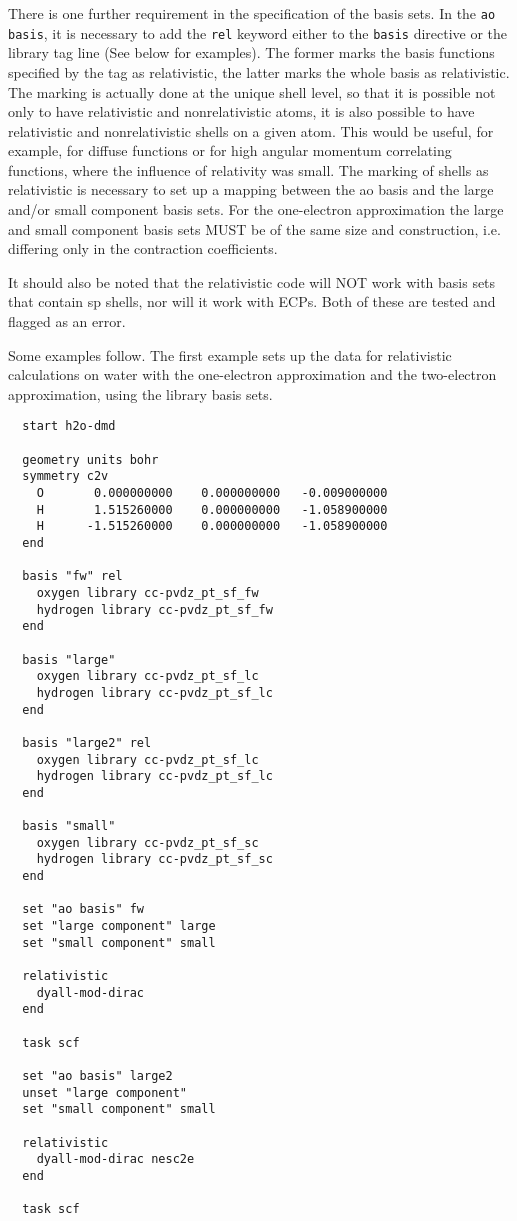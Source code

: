There is one further requirement in the specification of the basis sets. In
the \verb+ao basis+, it is necessary to add the \verb+rel+ keyword either to the
\verb+basis+ directive or the library tag line (See below for examples). 
The former marks the basis
functions specified by the tag as relativistic, the latter marks the whole
basis as relativistic. The marking is actually done at the unique shell
level, so that it is possible not only to have relativistic and
nonrelativistic atoms, it is also possible to have relativistic and
nonrelativistic shells on a given atom. This would be useful, for example,
for diffuse functions or for high angular momentum correlating functions,
where the influence of relativity was small. The marking of shells as
relativistic is necessary to set up a mapping between the ao basis and the
large and/or small component basis sets. For the one-electron approximation
the large and small component basis sets MUST be of the same size and
construction, i.e. differing only in the contraction coefficients.

It should also be noted that the relativistic code will NOT work with basis
sets that contain sp shells, nor will it work with ECPs. Both of these are
tested and flagged as an error.

Some examples follow. The first example sets up the data for relativistic
calculations on water with the one-electron approximation and the
two-electron approximation, using the library basis sets.

\begin{verbatim}
  start h2o-dmd

  geometry units bohr
  symmetry c2v
    O       0.000000000    0.000000000   -0.009000000
    H       1.515260000    0.000000000   -1.058900000
    H      -1.515260000    0.000000000   -1.058900000
  end

  basis "fw" rel
    oxygen library cc-pvdz_pt_sf_fw
    hydrogen library cc-pvdz_pt_sf_fw
  end

  basis "large"
    oxygen library cc-pvdz_pt_sf_lc
    hydrogen library cc-pvdz_pt_sf_lc
  end

  basis "large2" rel
    oxygen library cc-pvdz_pt_sf_lc
    hydrogen library cc-pvdz_pt_sf_lc
  end

  basis "small"
    oxygen library cc-pvdz_pt_sf_sc
    hydrogen library cc-pvdz_pt_sf_sc
  end

  set "ao basis" fw
  set "large component" large
  set "small component" small

  relativistic
    dyall-mod-dirac
  end

  task scf

  set "ao basis" large2
  unset "large component"
  set "small component" small

  relativistic
    dyall-mod-dirac nesc2e
  end

  task scf
\end{verbatim}

